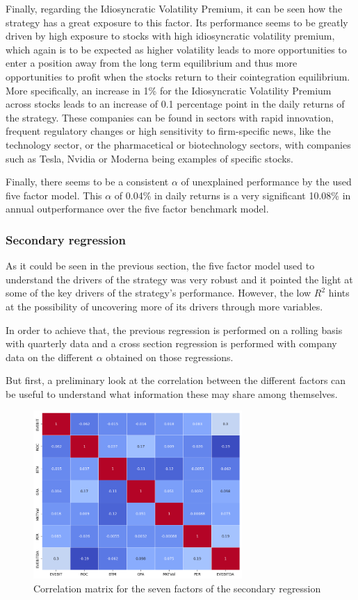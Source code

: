 Finally, regarding the Idiosyncratic Volatility Premium, it can be seen how the strategy has a great exposure to this factor. Its performance seems to be greatly driven by high exposure to stocks with high idiosyncratic volatility premium, which again is to be expected as higher volatility leads to more opportunities to enter a position away from the long term equilibrium and thus more opportunities to profit when the stocks return to their cointegration equilibrium. More specifically, an increase in 1\% for the Idiosyncratic Volatility Premium across stocks leads to an increase of 0.1 percentage point in the daily returns of the strategy. These companies can be found in sectors with rapid innovation, frequent regulatory changes or high sensitivity to firm-specific news, like the technology sector, or the pharmacetical or biotechnology sectors, with companies such as Tesla, Nvidia or Moderna being examples of specific stocks. 

Finally, there seems to be a consistent $\alpha$ of unexplained performance by the used five factor model. This $\alpha$ of 0.04\% in daily returns is a very significant 10.08\% in annual outperformance over the five factor benchmark model. 

\subsubsection{Secondary regression}
As it could be seen in the previous section, the five factor model used to understand the drivers of the strategy was very robust and it pointed the light at some of the key drivers of the strategy's performance. However, the low $R^2$ hints at the possibility of uncovering more of its drivers through more variables. 

In order to achieve that, the previous regression is performed on a rolling basis with quarterly data and a cross section regression is performed with company data on the different $\alpha$ obtained on those regressions. 

But first, a preliminary look at the correlation between the different factors can be useful to understand what information these may share among themselves. 
\newpage

\begin{figure}[ht]
    \centering
    \includegraphics[width=300px]{assets/factors-secondary-corr-matrix.png}
    \caption{Correlation matrix for the seven factors of the secondary regression}
    \label{fig:factors-secondary-corr-matrix}
\end{figure}

